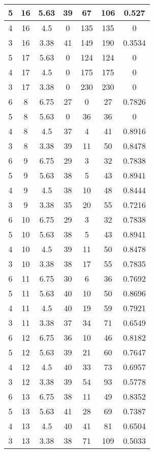 \documentclass[letterpaper, 12pt]{article}
\begin{document}
\begin{longtable}{|c|c|c|c|c|c|c|}
\hline
5 & 16 & 5.63 & 39 & 67 & 106 & 0.527 \\
\hline
4 & 16 & 4.5 & 0 & 135 & 135 & 0 \\
\hline
3 & 16 & 3.38 & 41 & 149 & 190 & 0.3534 \\
\hline
5 & 17 & 5.63 & 0 & 124 & 124 & 0 \\
\hline
4 & 17 & 4.5 & 0 & 175 & 175 & 0 \\
\hline
3 & 17 & 3.38 & 0 & 230 & 230 & 0 \\
\hline
6 & 8 & 6.75 & 27 & 0 & 27 & 0.7826 \\
\hline
5 & 8 & 5.63 & 0 & 36 & 36 & 0 \\
\hline
4 & 8 & 4.5 & 37 & 4 & 41 & 0.8916 \\
\hline
3 & 8 & 3.38 & 39 & 11 & 50 & 0.8478 \\
\hline
6 & 9 & 6.75 & 29 & 3 & 32 & 0.7838 \\
\hline
5 & 9 & 5.63 & 38 & 5 & 43 & 0.8941 \\
\hline
4 & 9 & 4.5 & 38 & 10 & 48 & 0.8444 \\
\hline
3 & 9 & 3.38 & 35 & 20 & 55 & 0.7216 \\
\hline
6 & 10 & 6.75 & 29 & 3 & 32 & 0.7838 \\
\hline
5 & 10 & 5.63 & 38 & 5 & 43 & 0.8941 \\
\hline
4 & 10 & 4.5 & 39 & 11 & 50 & 0.8478 \\
\hline
3 & 10 & 3.38 & 38 & 17 & 55 & 0.7835 \\
\hline
6 & 11 & 6.75 & 30 & 6 & 36 & 0.7692 \\
\hline
5 & 11 & 5.63 & 40 & 10 & 50 & 0.8696 \\
\hline
4 & 11 & 4.5 & 40 & 19 & 59 & 0.7921 \\
\hline
3 & 11 & 3.38 & 37 & 34 & 71 & 0.6549 \\
\hline
6 & 12 & 6.75 & 36 & 10 & 46 & 0.8182 \\
\hline
5 & 12 & 5.63 & 39 & 21 & 60 & 0.7647 \\
\hline
4 & 12 & 4.5 & 40 & 33 & 73 & 0.6957 \\
\hline
3 & 12 & 3.38 & 39 & 54 & 93 & 0.5778 \\
\hline
6 & 13 & 6.75 & 38 & 11 & 49 & 0.8352 \\
\hline
5 & 13 & 5.63 & 41 & 28 & 69 & 0.7387 \\
\hline
4 & 13 & 4.5 & 40 & 41 & 81 & 0.6504 \\
\hline
3 & 13 & 3.38 & 38 & 71 & 109 & 0.5033 \\
\hline

\end{longtable}
\end{document}
